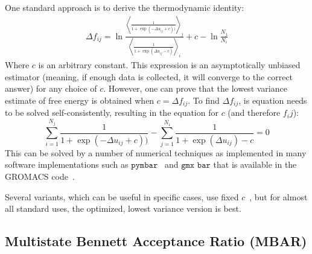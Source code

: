 \documentclass[9pt,review]{livecoms}
\begin{document}
One standard approach is to derive the thermodynamic identity:
\begin{eqnarray}
\Delta f_{ij} = \ln \frac{\left\langle \frac{1}{1 + \exp(-\Delta u_{ij}+c))}\right\rangle_j}{\left \langle \frac{1}{1 + \exp(\Delta u_{ij}-c)}\right\rangle_i} + c-\ln\frac{N_j}{N_i}
\end{eqnarray}
Where $c$ is an arbitrary constant. This expression is an asymptotically unbiased estimator (meaning, if enough data is collected, it will converge to the correct answer) for any choice
of $c$. However, one can prove that the lowest variance estimate of free energy is obtained when $c=\Delta f_{ij}$. To find $\Delta f_{ij}$, is equation needs to be solved self-consistently, resulting in the equation for $c$ (and therefore $f_ij$):
\begin{equation}
\sum_{i=1}^{N_j} \frac{1}{1 + \exp(-\Delta u_{ij}+c))} - \sum_{j=1}^{N_i} \frac{1}{1 + \exp(\Delta u_{ij})-c} = 0
\end{equation}
This can be solved by a number of numerical techniques as implemented in many software implementations such as $\texttt{pymbar}$~\cite{shirts-chodera:jcp:2008:mbar} and $\texttt{gmx bar}$ that is available in the GROMACS code~\cite{lindahl_2021}.

Several variants, which can be useful in specific cases, use fixed $c$~\cite{fenwick-escobedo:jcp:2003:replica-exchange-expanded-ensembles,Paliwal_comparison_2011}, but for almost all standard uses, the optimized, lowest variance version is best.


\subsection{Multistate Bennett Acceptance Ratio (MBAR)}
\end{document}
